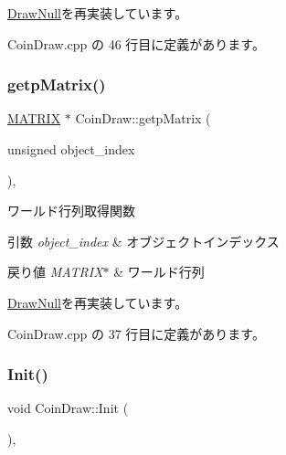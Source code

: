 \mbox{\hyperlink{class_draw_null_a0c1efe55fea325ad277594be6fe1e938}{Draw\+Null}}を再実装しています。



 Coin\+Draw.\+cpp の 46 行目に定義があります。

\mbox{\label{class_coin_draw_ad8cbbe87f4cf4428214f50492c731f5f}} 
\subsubsection{\texorpdfstring{getp\+Matrix()}{getpMatrix()}}
{\footnotesize\ttfamily \mbox{\hyperlink{_matrix_8h_a032295cd9fb1b711757c90667278e744}{M\+A\+T\+R\+IX}} $\ast$ Coin\+Draw\+::getp\+Matrix (\begin{DoxyParamCaption}\item[{unsigned}]{object\+\_\+index }\end{DoxyParamCaption})\hspace{0.3cm}{\ttfamily [override]}, {\ttfamily [virtual]}}



ワールド行列取得関数 


\begin{DoxyParams}{引数}
{\em object\+\_\+index} & オブジェクトインデックス \\
\hline
\end{DoxyParams}

\begin{DoxyRetVals}{戻り値}
{\em M\+A\+T\+R\+I\+X$\ast$} & ワールド行列 \\
\hline
\end{DoxyRetVals}


\mbox{\hyperlink{class_draw_null_a9aac059eb3b5d1f77e8bd3aa0647cff9}{Draw\+Null}}を再実装しています。



 Coin\+Draw.\+cpp の 37 行目に定義があります。

\mbox{\label{class_coin_draw_ad0f5da5cfb896541fd59b1ab4a8593d1}} 
\subsubsection{\texorpdfstring{Init()}{Init()}}
{\footnotesize\ttfamily void Coin\+Draw\+::\+Init (\begin{DoxyParamCaption}{ }\end{DoxyParamCaption})\hspace{0.3cm}{\ttfamily [override]}, {\ttfamily [virtual]}}



